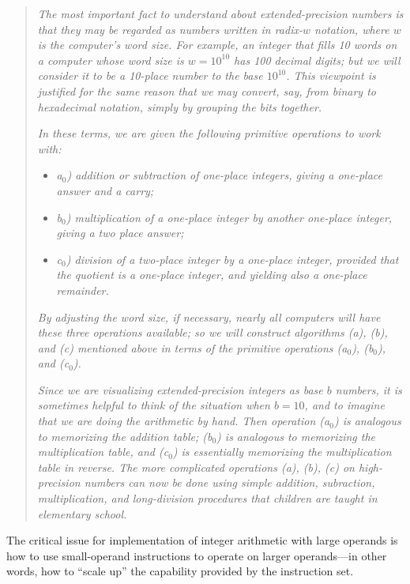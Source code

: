 \begin{quote}
\emph{The most important fact to understand about extended-precision numbers
is that they may be regarded as numbers written in radix-$w$ notation,
where $w$ is the computer's word size.  For example, an integer that
fills 10 words on a computer whose word size is $w=10^{10}$ has 100
decimal digits; but we will consider it to be a 10-place number to
the base $10^{10}$.  This viewpoint is justified for the same reason
that we may convert, say, from binary to hexadecimal notation,
simply by grouping the bits together.}

\emph{In these terms, we are given the following primitive operations to work with:}

\begin{itemize}
\item \emph{a$_0$) addition or subtraction of one-place integers, giving a one-place
             answer and a carry;}
\item \emph{b$_0$) multiplication of a one-place integer by another one-place integer,
             giving a two place answer;}
\item \emph{c$_0$) division of a two-place integer by a one-place integer, 
             provided that the quotient is a one-place integer, and yielding
			    also a one-place remainder.}
\end{itemize}

\noindent{}\emph{By adjusting the word size, if necessary, nearly all computers
will have these three operations available; so we will construct algorithms
(a), (b), and (c) mentioned above in terms of the primitive operations
(a$_0$), (b$_0$), and (c$_0$).}

\emph{Since we are visualizing extended-precision integers as base $b$ numbers, it is
sometimes helpful to think of the situation when $b = 10$, and to imagine
that we are doing the arithmetic by hand.  Then operation (a$_0$) is analogous
to memorizing the addition table; (b$_0$) is analogous to memorizing the 
multiplication table, and (c$_0$) is essentially memorizing the multiplication
table in reverse.  The more complicated operations (a), (b), (c) on
high-precision numbers can now be done using simple addition, subraction,
multiplication, and long-division procedures that children are taught
in elementary school.}
\end{quote}

The critical issue for implementation of integer arithmetic with large operands
is how to use small-operand instructions to operate on larger operands---in other words,
how to ``scale up'' the capability provided by the instruction set. 


